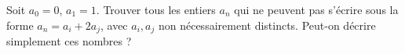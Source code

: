 Soit $a_0 = 0$, $a_1 = 1$. Trouver tous les entiers $a_n$ qui ne peuvent pas s'écrire sous la forme $a_n = a_i + 2a_j$, avec $a_i, a_j$ non nécessairement distincts. Peut-on décrire simplement ces nombres ?
